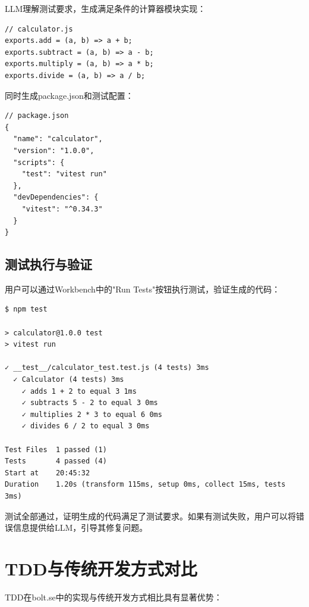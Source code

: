 LLM理解测试要求，生成满足条件的计算器模块实现：

\begin{verbatim}
// calculator.js
exports.add = (a, b) => a + b;
exports.subtract = (a, b) => a - b;
exports.multiply = (a, b) => a * b;
exports.divide = (a, b) => a / b;
\end{verbatim}

同时生成package.json和测试配置：

\begin{verbatim}
// package.json
{
  "name": "calculator",
  "version": "1.0.0",
  "scripts": {
    "test": "vitest run"
  },
  "devDependencies": {
    "vitest": "^0.34.3"
  }
}
\end{verbatim}

\subsection{测试执行与验证}

用户可以通过Workbench中的"Run Tests"按钮执行测试，验证生成的代码\cite{Vitest2023}：

\begin{verbatim}
$ npm test

> calculator@1.0.0 test
> vitest run

✓ __test__/calculator_test.test.js (4 tests) 3ms
  ✓ Calculator (4 tests) 3ms
    ✓ adds 1 + 2 to equal 3 1ms
    ✓ subtracts 5 - 2 to equal 3 0ms
    ✓ multiplies 2 * 3 to equal 6 0ms
    ✓ divides 6 / 2 to equal 3 0ms

Test Files  1 passed (1)
Tests       4 passed (4)
Start at    20:45:32
Duration    1.20s (transform 115ms, setup 0ms, collect 15ms, tests 3ms)
\end{verbatim}

测试全部通过，证明生成的代码满足了测试要求。如果有测试失败，用户可以将错误信息提供给LLM，引导其修复问题。

\section{TDD与传统开发方式对比}

TDD在bolt.se中的实现与传统开发方式相比具有显著优势：

